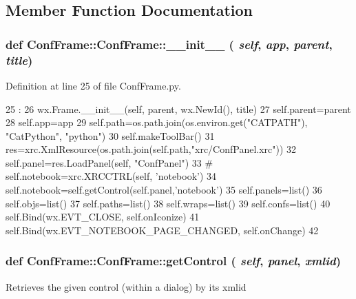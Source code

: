 \subsection{Member Function Documentation}
\hypertarget{classConfFrame_1_1ConfFrame_a5df54c06eb14db3e13ef26fd046194a6}{
\subsubsection[{\_\-\_\-init\_\-\_\-}]{\setlength{\rightskip}{0pt plus 5cm}def ConfFrame::ConfFrame::\_\-\_\-init\_\-\_\- ( {\em self}, \/   {\em app}, \/   {\em parent}, \/   {\em title})}}
\label{classConfFrame_1_1ConfFrame_a5df54c06eb14db3e13ef26fd046194a6}


Definition at line 25 of file ConfFrame.py.


\begin{DoxyCode}
25                                        : 
26         wx.Frame.__init__(self, parent, wx.NewId(), title)
27         self.parent=parent
28         self.app=app
29         self.path=os.path.join(os.environ.get("CATPATH"), "CatPython", "python")
30         self.makeToolBar()
31         res=xrc.XmlResource(os.path.join(self.path,"xrc/ConfPanel.xrc"))
32         self.panel=res.LoadPanel(self, "ConfPanel")
33 #        self.notebook=xrc.XRCCTRL(self, 'notebook')
34         self.notebook=self.getControl(self.panel,'notebook')
35         self.panels=list()
36         self.objs=list()
37         self.paths=list()
38         self.wraps=list()
39         self.confs=list()
40         self.Bind(wx.EVT_CLOSE, self.onIconize)
41         self.Bind(wx.EVT_NOTEBOOK_PAGE_CHANGED, self.onChange)
42 
\end{DoxyCode}
\hypertarget{classConfFrame_1_1ConfFrame_ac5c3c5b5f7c27b499ea1613d3390940f}{
\subsubsection[{getControl}]{\setlength{\rightskip}{0pt plus 5cm}def ConfFrame::ConfFrame::getControl ( {\em self}, \/   {\em panel}, \/   {\em xmlid})}}
\label{classConfFrame_1_1ConfFrame_ac5c3c5b5f7c27b499ea1613d3390940f}
\begin{DoxyVerb}Retrieves the given control (within a dialog) by its xmlid\end{DoxyVerb}
 

